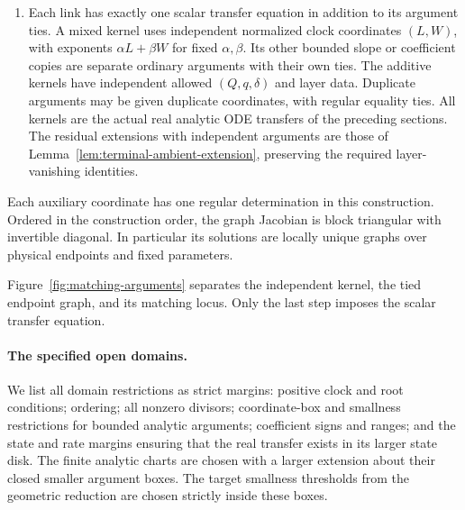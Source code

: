 \begin{enumerate}
correction.  For example in an additive annulus, if
$z_+=v_+-v_--\kappa S$, then
\[
 D_i=\chi_iQ^{p_i}e^{d_i v_+-d_i z_+}
     =\chi_iQ^{p_i}e^{d_i v_-+d_i\kappa S}.
\]
Thus the proposed final state cancels from the actual-flow amplitude.
The analogous mixed identity is
\[
 \chi_i e^{a_i\theta_++\beta_i v_+-\beta_i z_+}
 =\chi_i e^{a_i\theta_++\beta_i v_-+\beta_i\kappa W}.
\]
These are identities on the tied endpoint graph, including mismatched
endpoints.  Signed or zero amplitudes are handled by products, without
extracting roots from their signs.  An invariant diagonal expression
is evaluated at one end only.  Its weight-zero identity makes it
constant under the relevant nearby endpoint variation at fixed field
parameters.  No redundant second equality is added for that identity.
\item Each link has exactly one scalar transfer equation in addition
to its argument ties.  A mixed kernel uses independent normalized
clock coordinates $(L,W)$, with exponents $\alpha L+\beta W$ for
fixed $\alpha,\beta$.  Its other bounded slope or coefficient copies
are separate ordinary arguments with their own ties.  The additive
kernels have independent allowed $(Q,q,\delta)$ and layer data.
Duplicate arguments may be given duplicate coordinates, with regular
equality ties.  All kernels are the actual real analytic ODE
transfers of the preceding sections.  The residual extensions with
independent arguments are those of
Lemma~\ref{lem:terminal-ambient-extension}, preserving the required
layer-vanishing identities.
\end{enumerate}
Each auxiliary coordinate has one regular determination in this
construction.  Ordered in the construction order, the graph
Jacobian is block triangular with invertible diagonal.  In
particular its solutions are locally unique graphs over physical
endpoints and fixed parameters.

Figure~\ref{fig:matching-arguments} separates the independent kernel,
the tied endpoint graph, and its matching locus.  Only the last step
imposes the scalar transfer equation.


\paragraph{The specified open domains.}
We list all domain restrictions as strict margins: positive clock
and root conditions; ordering; all nonzero divisors; coordinate-box
and smallness restrictions for bounded analytic arguments; coefficient
signs and ranges; and the state and rate margins ensuring that the
real transfer exists in its larger state disk.  The finite analytic
charts are chosen with a larger extension about their closed smaller
argument boxes.  The target smallness thresholds from the geometric
reduction are chosen strictly inside these boxes.

